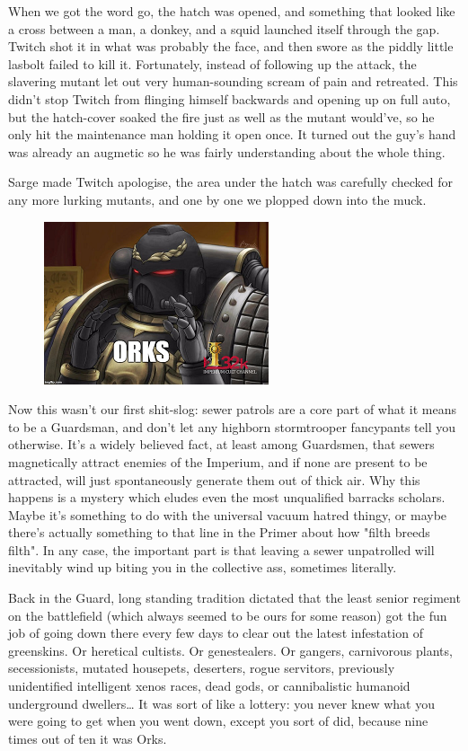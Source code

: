 When we got the word go, the hatch was opened, and something that looked like a cross between a man, a donkey, and a squid launched itself through the gap. 
Twitch shot it in what was probably the face, and then swore as the piddly little lasbolt failed to kill it. 
Fortunately, instead of following up the attack, the slavering mutant let out very human-sounding scream of pain and retreated. 
This didn't stop Twitch from flinging himself backwards and opening up on full auto, but the hatch-cover soaked the fire just as well as the mutant would've, so he only hit the maintenance man holding it open once. 
It turned out the guy's hand was already an augmetic so he was fairly understanding about the whole thing.

Sarge made Twitch apologise, the area under the hatch was carefully checked for any more lurking mutants, and one by one we plopped down into the muck.

\begin{figure}
	\begin{center}
		\includegraphics[width=\figwidth]{pics/18/4.png}
	\end{center}
\end{figure}
Now this wasn't our first shit-slog: 
sewer patrols are a core part of what it means to be a Guardsman, and don't let any highborn stormtrooper fancypants tell you otherwise. 
It's a widely believed fact, at least among Guardsmen, that sewers magnetically attract enemies of the Imperium, and if none are present to be attracted, will just spontaneously generate them out of thick air. 
Why this happens is a mystery which eludes even the most unqualified barracks scholars. 
Maybe it's something to do with the universal vacuum hatred thingy, or maybe there's actually something to that line in the Primer about how "filth breeds filth". 
In any case, the important part is that leaving a sewer unpatrolled will inevitably wind up biting you in the collective ass, sometimes literally. 


Back in the Guard, long standing tradition dictated that the least senior regiment on the battlefield (which always seemed to be ours for some reason) got the fun job of going down there every few days to clear out the latest infestation of greenskins. 
Or heretical cultists. 
Or genestealers. 
Or gangers, carnivorous plants, secessionists, mutated housepets, deserters, rogue servitors, previously unidentified intelligent xenos races, dead gods, or cannibalistic humanoid underground dwellers… It was sort of like a lottery: 
you never knew what you were going to get when you went down, except you sort of did, because nine times out of ten it was Orks. 


